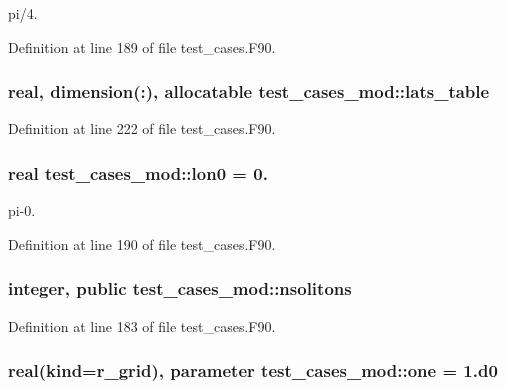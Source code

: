 pi/4. 



Definition at line 189 of file test\-\_\-cases.\-F90.

\subsubsection[{lats\-\_\-table}]{\setlength{\rightskip}{0pt plus 5cm}real, dimension(\-:), allocatable test\-\_\-cases\-\_\-mod\-::lats\-\_\-table\hspace{0.3cm}{\ttfamily [private]}}\label{classtest__cases__mod_ab29f3455dbdffa40ac33075ff47eb95f}


Definition at line 222 of file test\-\_\-cases.\-F90.

\subsubsection[{lon0}]{\setlength{\rightskip}{0pt plus 5cm}real test\-\_\-cases\-\_\-mod\-::lon0 = 0.\hspace{0.3cm}{\ttfamily [private]}}\label{classtest__cases__mod_a982d8969b8cd286c0d2749f4a85fab51}


pi-\/0. 



Definition at line 190 of file test\-\_\-cases.\-F90.

\subsubsection[{nsolitons}]{\setlength{\rightskip}{0pt plus 5cm}integer, public test\-\_\-cases\-\_\-mod\-::nsolitons}\label{classtest__cases__mod_a124b5e4b27425c730d7182f93a7cb99d}


Definition at line 183 of file test\-\_\-cases.\-F90.

\subsubsection[{one}]{\setlength{\rightskip}{0pt plus 5cm}real(kind=r\-\_\-grid), parameter test\-\_\-cases\-\_\-mod\-::one = 1.d0\hspace{0.3cm}{\ttfamily [private]}}\label{classtest__cases__mod_a9fee1aae0eeafb2591001b28a9890b6c}


